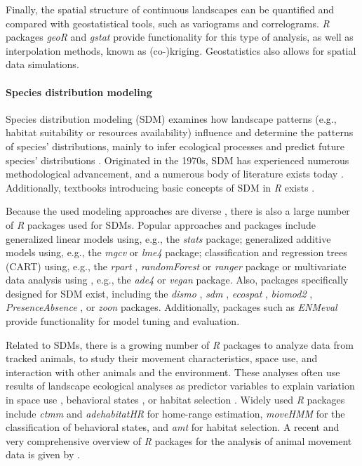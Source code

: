 \documentclass[smallextended]{svjour3}       %
\begin{document}
Finally, the spatial structure of continuous landscapes can be quantified and compared with geostatistical tools, such as variograms and correlograms.
\textit{R} packages \textit{geoR} \cite{Diggle2007} and \textit{gstat} \cite{Pebesma2004} provide functionality for this type of analysis, as well as interpolation methods, known as (co-)kriging.
Geostatistics also allows for spatial data simulations.

\hypertarget{sec:SDM}{%
\paragraph{Species distribution modeling}\label{sec:SDM}}

Species distribution modeling (SDM) examines how landscape patterns (e.g., habitat suitability or resources availability) influence and determine the patterns of species' distributions, mainly to infer ecological processes and predict future species' distributions \cite{Wiersma2011}.
Originated in the 1970s, SDM has experienced numerous methodological advancement, and a numerous body of literature exists today \cite{Zimmermann2010,Norberg2019}.
Additionally, textbooks introducing basic concepts of SDM in \textit{R} exists \cite{Guisan2017,Fletcher2018}.

Because the used modeling approaches are diverse \cite{Hooten2011,Kerr2011,Fletcher2018}, there is also a large number of \textit{R} packages used for SDMs.
Popular approaches and packages include generalized linear models using, e.g., the \textit{stats} \cite{RCoreTeam2019} package; generalized additive models using, e.g., the \textit{mgcv} \cite{Wood2017} or \textit{lme4} \cite{Bates2015} package; classification and regression trees (CART) using, e.g., the \textit{rpart} \cite{Therneau2019}, \textit{randomForest} \cite{Liaw2002} or \textit{ranger} \cite{Wright2017} package or multivariate data analysis using , e.g., the \textit{ade4} \cite{Dray2007} or \textit{vegan} \cite{Oksanen2019} package.
Also, packages specifically designed for SDM exist, including the \textit{dismo} \cite{Hijmans2017}, \textit{sdm} \cite{Naimi2016}, \textit{ecospat} \cite{Broennimann2020}, \textit{biomod2} \cite{Thuiller2020}, \textit{PresenceAbsence} \cite{Freeman2008}, or \textit{zoon} \cite{Golding2018} packages.
Additionally, packages such as \textit{ENMeval} \cite{Muscarella2014} provide functionality for model tuning and evaluation.

Related to SDMs, there is a growing number of \textit{R} packages to analyze data from tracked animals, to study their movement characteristics, space use, and interaction with other animals and the environment.
These analyses often use results of landscape ecological analyses as predictor variables to explain variation in space use \cite{Signer2015}, behavioral states \cite{Langrock2012}, or habitat selection \cite{Fieberg2020}.
Widely used \textit{R} packages include \textit{ctmm} \cite{Calabrese2016} and \textit{adehabitatHR} \cite{Calenge2006} for home-range estimation, \textit{moveHMM} \cite{Michelot2016} for the classification of behavioral states, and \textit{amt} \cite{Signer2019} for habitat selection.
A recent and very comprehensive overview of \textit{R} packages for the analysis of animal movement data is given by \cite{Joo2020}.
\end{document}
